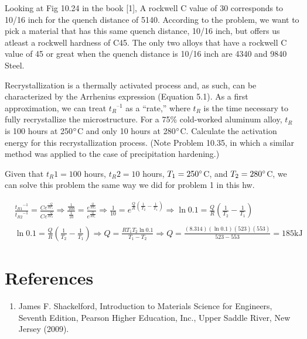 \documentclass[12pt]{article}
\newenvironment{problem}[2][Problem]{\begin{trivlist}
\item[\hskip \labelsep {\bfseries #1}\hskip \labelsep {\bfseries #2.}]}{\end{trivlist}}
\begin{document}
 Looking at Fig 10.24 in the book [1], A rockwell C value of 30 corresponds to 10/16 inch for the quench distance of 5140. According to the problem, we want to pick a material that has this same quench distance, 10/16 inch, but offers us atleast a rockwell hardness of C45. The only two alloys that have a rockwell C value of 45 or great when the quench distance is 10/16 inch are 4340 and 9840 Steel.
 
 \begin{problem}{10.41}
 Recrystallization is a thermally activated process and, as such, can be characterized by the Arrhenius expression (Equation 5.1). As a first approximation, we can treat ${t_R}^{–1}$ as a “rate,” where $t_R$ is the time necessary to fully recrystallize the microstructure.  For a 75\% cold-worked aluminum alloy, $t_R$ is 100 hours at 250$\degree$C and only 10 hours at 280$\degree$C.  Calculate the activation energy for this recrystallization process. (Note Problem 10.35, in which a similar method was applied to the case of precipitation hardening.)
 \end{problem}
 
 Given that $t_R1 = 100$ hours, $t_R2 = 10$ hours, $T_1 = 250\degree$C, and $T_2 = 280\degree$C, we can solve this problem the same way we did for problem 1 in this hw.
 
 \begin{align*}
 &\frac{{t_{R1}}^{-1}}{{t_{R2}}^{-1}} = \frac{Ce^{\frac{-Q}{RT_1}}}{Ce^{\frac{-Q}{RT_2}}} \Rightarrow \frac{\frac{1}{100}}{\frac{1}{10}} = \frac{e^{\frac{Q}{RT_2}}}{e^{\frac{Q}{RT_1}}} \Rightarrow \frac{1}{10} = e^{\frac{Q}{R}(\frac{1}{T_2}-\frac{1}{T_1})} \Rightarrow \ln{0.1} = \frac{Q}{R}(\frac{1}{T_2}-\frac{1}{T_1}) \\\\ & \ln{0.1} = \frac{Q}{R}(\frac{1}{T_2}-\frac{1}{T_1}) \Rightarrow Q = \frac{RT_1T_2\ln{0.1}}{T_1 - T_2} \Rightarrow Q = \frac{(8.314)(\ln{0.1})(523)(553)}{523 - 553} = 185\text{kJ}
 \end{align*}

\section{References}
\begin{enumerate}
\item James F. Shackelford, Introduction to Materials Science for Engineers, Seventh Edition, Pearson Higher Education, Inc., Upper Saddle River, New Jersey (2009).
\end{enumerate}




 
\end{document}
